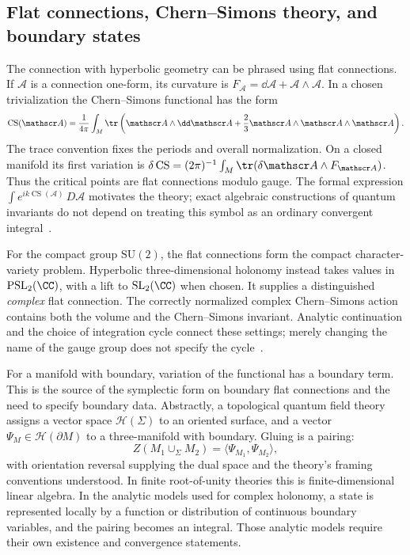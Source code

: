 \subsection{Flat connections, Chern--Simons theory, and boundary states}
\label{sec:introCS}

The connection with hyperbolic geometry can be phrased using flat
connections. If $\mathscr A$ is a connection one-form, its curvature
is $F_{\mathscr A}=\dd\mathscr A+\mathscr A\wedge\mathscr A$.
In a chosen trivialization the Chern--Simons functional has the form
\begin{equation}
 \operatorname{CS}(\mathscr A)=\frac1{4\pi}\int_M
   \tr\left(\mathscr A\wedge\dd\mathscr A
                    +\frac23\mathscr A\wedge\mathscr A\wedge\mathscr A\right).
 \label{eq:introCSfunctional}
\end{equation}
The trace convention fixes the periods and overall normalization.
On a closed manifold its first variation is
$\delta\operatorname{CS}=(2\pi)^{-1}\int_M
\tr(\delta\mathscr A\wedge F_{\mathscr A})$.
Thus the critical points are flat connections modulo gauge.
The formal expression
$\int e^{ik\operatorname{CS}(\mathscr A)}\,D\mathscr A$
motivates the theory; exact algebraic constructions of quantum
invariants do not depend on treating this symbol as an ordinary
convergent integral~\cite{WittenJones}.

For the compact group $\mathrm{SU}(2)$, the flat connections form
the compact character-variety problem. Hyperbolic three-dimensional
holonomy instead takes values in $\mathrm{PSL}_2(\CC)$, with a lift
to $\mathrm{SL}_2(\CC)$ when chosen. It supplies a distinguished
\emph{complex} flat connection. The correctly normalized complex
Chern--Simons action contains both the volume and the Chern--Simons
invariant. Analytic continuation and the choice of integration
cycle connect these settings; merely changing the name of the
gauge group does not specify the cycle~\cite{GukovApoly,WittenContinuation}.

For a manifold with boundary, variation of the functional has a
boundary term. This is the source of the symplectic form on boundary
flat connections and the need to specify boundary data. Abstractly,
a topological quantum field theory assigns a vector space
$\mathcal H(\Sigma)$ to an oriented surface, and a vector
$\Psi_M\in\mathcal H(\partial M)$ to a three-manifold with boundary.
Gluing is a pairing:
\[
 Z(M_1\cup_\Sigma M_2)=\langle\Psi_{M_1},\Psi_{M_2}\rangle,
\]
with orientation reversal supplying the dual space and the theory's
framing conventions understood. In finite root-of-unity theories
this is finite-dimensional linear algebra. In the analytic models
used for complex holonomy, a state is represented locally by a
function or distribution of continuous boundary variables, and
the pairing becomes an integral. Those analytic models require
their own existence and convergence statements.

